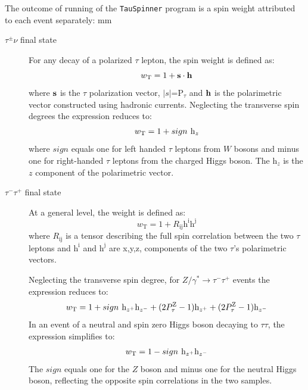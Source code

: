 \documentclass[12pt]{article}
\def\Ztautau{\ensuremath{Z/\gamma^{*}\to\tau^{-}\tau^{+}}\xspace}
\def\TauNu{\ensuremath{\tau^{\pm}\nu}\xspace}
\def\TauTau{\ensuremath{\tau^{-}\tau^{+}}\xspace}
\def\Tau{\ensuremath{\tau}\xspace}
\def\PTAUZ{\ensuremath{P_{\tau}^{\mathrm{Z}}}\xspace}
\begin{document}
The outcome of running of the {\tt TauSpinner} program is 
a spin weight attributed to each event separately: 
 mm
\begin{description}
\item[\TauNu final state] For any decay of a polarized \Tau
 lepton, the spin weight is defined as: 
\begin{equation}\label{eq:3}
w_\mathrm{T}=1+\bf{s}\cdot\bf{h} 
\end{equation}
where $\bf{s}$ is the \Tau polarization vector, $|s|$=P$_\tau$
and $\bf{h}$ is the polarimetric vector constructed using hadronic currents.
Neglecting the transverse spin degrees the
expression reduces to:
\[
w_\mathrm{T}=1+sign\hspace{0.05in} \mathrm{h}_z
\]
where $sign$ equals one for left handed \Tau leptons from $W$ bosons and
minus one for right-handed \Tau leptons from the charged Higgs boson.
The h$_z$ is the $z$ component of the polarimetric vector.
\item[\TauTau final state] At a general level, the weight is
 defined as:
\begin{equation}\label{eq:4}
w_\mathrm{T}=1+R_{\mathrm{ij}}\mathrm{h}^{\mathrm{i}}\mathrm{h}^{\mathrm{j}}
\end{equation}
where $R_{\mathrm{ij}}$ is a tensor describing the full spin correlation
between the two \Tau leptons and $\mathrm{h}^{\mathrm{i}}$ and $\mathrm{h}^{\mathrm{j}}$
are x,y,z, components of the two \Tau's polarimetric vectors.

Neglecting the transverse spin degree, for \Ztautau events the expression reduces to:
\[
w_\mathrm{T}=1 + sign\hspace{0.05in}\mathrm{h}_{z^{+}}\mathrm{h}_{z^{-}} + (2\PTAUZ -1) \mathrm{h}_{z^{+}} + (2\PTAUZ -1)\mathrm{h}_{z^{-}}
\]
In an event of a neutral and spin zero Higgs boson decaying to \Tau\Tau, 
the expression simplifies to:
\[
w_\mathrm{T}=1 - sign\hspace{0.05in}\mathrm{h}_{z^{+}}\mathrm{h}_{z^{-}}
\]
The $sign$ equals one for the $Z$ boson and minus one for the neutral Higgs boson,
reflecting the opposite spin correlations in the two samples.
\end{description}
\end{document}
